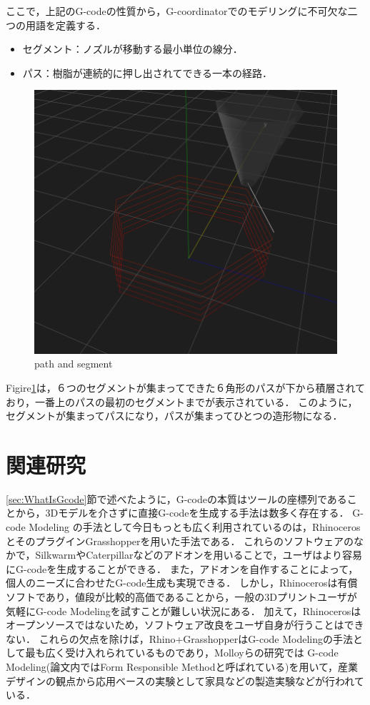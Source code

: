 \documentclass{article}
\begin{document}
\begin{twocolumn}
ここで，上記のG-codeの性質から，G-coordinatorでのモデリングに不可欠な二つの用語を定義する．
\begin{itemize}
  \item セグメント：ノズルが移動する最小単位の線分．
  \item パス：樹脂が連続的に押し出されてできる一本の経路．
\end{itemize}
\begin{figure}[h]
  \centering
  \includegraphics[width=0.8\linewidth]{img/path_segment.png}
  \caption{path and segment}
  \label{fig:2}
\end{figure}
Figire\ref{fig:2}は，６つのセグメントが集まってできた６角形のパスが下から積層されており，一番上のパスの最初のセグメントまでが表示されている．
このように，セグメントが集まってパスになり，パスが集まってひとつの造形物になる．




\section{関連研究}

\ref{sec:WhatIsGcode}節で述べたように，G-codeの本質はツールの座標列であることから，3Dモデルを介さずに直接G-codeを生成する手法は数多く存在する．
G-code Modeling の手法として今日もっとも広く利用されているのは，RhinocerosとそのプラグインGrasshopperを用いた手法である．
これらのソフトウェアのなかで，Silkwarm\cite{silkworm}やCaterpillar\cite{caterpillar}などのアドオンを用いることで，ユーザはより容易にG-codeを生成することができる．
また，アドオンを自作することによって，個人のニーズに合わせたG-code生成も実現できる．
しかし，Rhinocerosは有償ソフトであり，値段が比較的高価であることから，一般の3Dプリントユーザが気軽にG-code Modelingを試すことが難しい状況にある．
加えて，Rhinocerosはオープンソースではないため，ソフトウェア改良をユーザ自身が行うことはできない．
これらの欠点を除けば，Rhino+GrasshopperはG-code Modelingの手法として最も広く受け入れられているものであり，Molloyらの研究\cite{molloy2018digital}では
G-code Modeling(論文内ではForm Responsible Methodと呼ばれている)を用いて，産業デザインの観点から応用ベースの実験として家具などの製造実験などが行われている．


\end{twocolumn}
\end{document}
